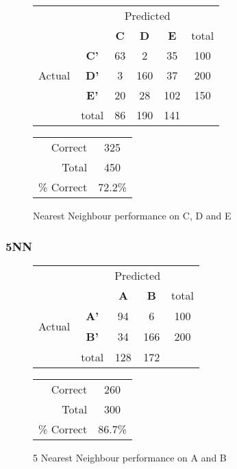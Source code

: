 \begin{figure}[!ht]
\begin{minipage}[b]{0.5\linewidth}
\centering
	\begin{tabular}{ccc|c|c|c}
	 & &\multicolumn{3}{c}{Predicted} &\\
	  & & \bf{C} &  \bf{D} & \bf{E} & total \\
	 \cline{3-6}
	 \multirow{3}{*}{\begin{sideways}Actual\end{sideways}} & \bf{C'}& 63 & 2 & 35 & 100\\
	 \cline{3-6}
	 & \bf{D'}& 3 & 160 & 37 & 200\\
	  \cline{3-6}
	 & \bf{E'}& 20 & 28 & 102 &  150\\
	  \cline{3-6}
	 &total&86&190&141\\
	\end{tabular}
\end{minipage}
\hspace{0.5cm}
\begin{minipage}[b]{0.5\linewidth}
	\begin{tabular}{r|c}
	\hline
	Correct& 325\\
	Total& 450 \\
	\hline
	\% Correct& 72.2\%\\
	\hline
	\end{tabular}
\end{minipage}
\vspace{1mm}
\caption{Nearest Neighbour performance on C, D and E}
\end{figure}


\subsubsection{5NN}
\begin{figure}[!ht]
\begin{minipage}[b]{0.5\linewidth}
\centering
	\begin{tabular}{ccc|c|c}
	 & &\multicolumn{2}{c}{Predicted} &\\
	  & & \bf{A} &  \bf{B} & total \\
	 \cline{3-5}
	 \multirow{2}{*}{\begin{sideways}Actual\end{sideways}} & \bf{A'}& 94 & 6 & 100 \\
	 \cline{3-5}
	 & \bf{B'}& 34 & 166 & 200 \\
	  \cline{3-5}
	 &total&128&172\\
	\end{tabular}
\end{minipage}
\hspace{0.5cm}
\begin{minipage}[b]{0.5\linewidth}
	\begin{tabular}{r|c}
	\hline
	Correct& 260\\
	Total& 300\\
	\hline
	\% Correct& 86.7\%\\
	\hline
	\end{tabular}
\end{minipage}
\vspace{1mm}
\caption{5 Nearest Neighbour performance on A and B}
\end{figure}

